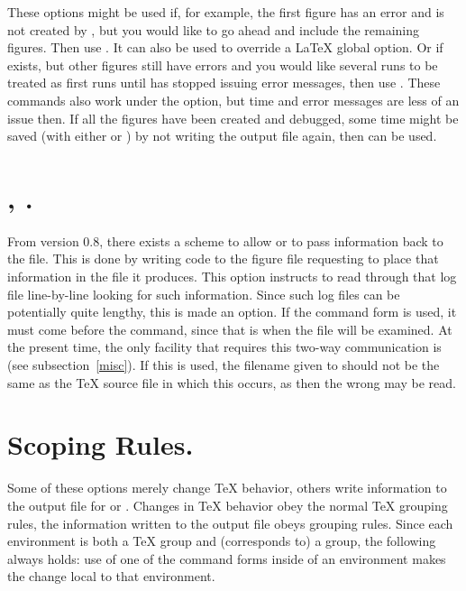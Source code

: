 \documentclass[letterpaper]{article}
\begin{document}
These options might be used if, for example, the first figure has an
error and is not created by \MP{}, but you would like \mfp{} to go
ahead and include the remaining figures. Then use . It can
also be used to override a \LaTeX{} global  option. Or if
 exists, but other figures still have errors and you
would like several runs to be treated as first runs until \MP{} has
stopped issuing error messages, then use .  These commands
also work under the  option, but time and error messages
are less of an issue then. If all the figures have been created and
debugged, some time might be saved (with either  or
) by not writing the output file again, then 
can be used.

\section{, .}\label{readlog}
%

From version 0.8, there exists a scheme to allow \MF{} or \MP{} to pass
information back to the  file. This is done by writing code
to the figure file requesting \MF{} to place that information in the
 file it produces. This option instructs \mfp{} to
read through that log file line-by-line looking for such information.
Since such log files can be potentially quite lengthy, this is made an
option. If the command form  is used, it must come before
the  command, since that is when the file will be
examined. At the present time, the only \mfp{} facility that requires
this two-way communication is  (see
subsection~\ref{misc}). If this is used, the filename given to
 should not be the same as the \TeX{} source file in
which this occurs, as then the wrong  may be read.


\section{Scoping Rules.}\label{scoping}

Some of these options merely change \TeX{} behavior, others write
information to the output file for \MF{} or \MP{}. Changes in \TeX{}
behavior obey the normal \TeX{} grouping rules, the information written
to the output file obeys \MF{} grouping rules. Since each 
environment is both a \TeX{} group and (corresponds to) a \MF{} group,
the following always holds: use of one of the command forms inside of an
 environment makes the change local to that environment.
\end{document}
